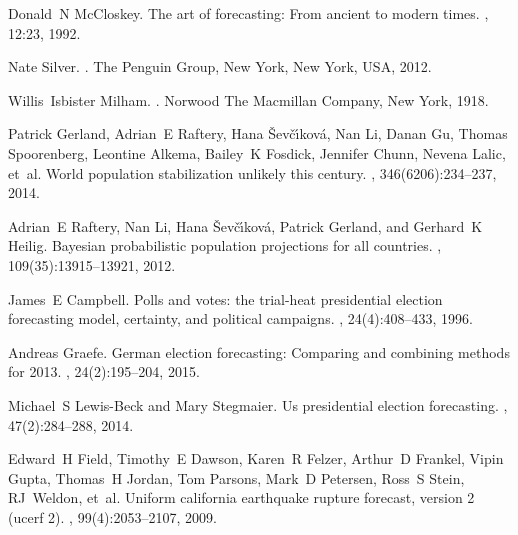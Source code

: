 \documentclass[a4paper]{article}
\begin{document}

 \newcommand{\noop}[1]{}
\begin{thebibliography}{100}

Donald~N McCloskey.
\newblock The art of forecasting: From ancient to modern times.
, 12:23, 1992.

Nate Silver.
.
\newblock The Penguin Group, New York, New York, USA, 2012.

Willis~Isbister Milham.
.
\newblock Norwood The Macmillan Company, New York, 1918.

Patrick Gerland, Adrian~E Raftery, Hana {\v{S}}ev{\v{c}}{\'\i}kov{\'a}, Nan Li,
  Danan Gu, Thomas Spoorenberg, Leontine Alkema, Bailey~K Fosdick, Jennifer
  Chunn, Nevena Lalic, et~al.
\newblock World population stabilization unlikely this century.
, 346(6206):234--237, 2014.

Adrian~E Raftery, Nan Li, Hana {\v{S}}ev{\v{c}}{\'\i}kov{\'a}, Patrick Gerland,
  and Gerhard~K Heilig.
\newblock Bayesian probabilistic population projections for all countries.
,
  109(35):13915--13921, 2012.

James~E Campbell.
\newblock Polls and votes: the trial-heat presidential election forecasting
  model, certainty, and political campaigns.
, 24(4):408--433, 1996.

Andreas Graefe.
\newblock German election forecasting: Comparing and combining methods for
  2013.
, 24(2):195--204, 2015.

Michael~S Lewis-Beck and Mary Stegmaier.
\newblock Us presidential election forecasting.
, 47(2):284--288, 2014.

Edward~H Field, Timothy~E Dawson, Karen~R Felzer, Arthur~D Frankel, Vipin
  Gupta, Thomas~H Jordan, Tom Parsons, Mark~D Petersen, Ross~S Stein,
  RJ~Weldon, et~al.
\newblock Uniform california earthquake rupture forecast, version 2 (ucerf 2).
,
  99(4):2053--2107, 2009.


\end{thebibliography}
\end{document}
